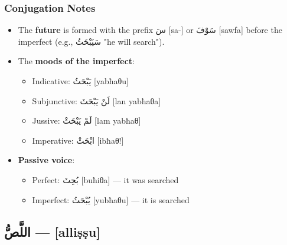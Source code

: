 \documentclass[letter,12pt]{article}
\begin{document}
\subsubsection*{Conjugation Notes}
\begin{itemize}
  \item The \textbf{future} is formed with the prefix \textarabic{سَ} [sa-] or \textarabic{سَوْفَ} [sawfa] before the imperfect (e.g., \textarabic{سَيَبْحَثُ} "he will search").
  \item The \textbf{moods of the imperfect}: 
    \begin{itemize}
      \item Indicative: \textarabic{يَبْحَثُ} [yabħaθu] 
      \item Subjunctive: \textarabic{لَنْ يَبْحَثَ} [lan yabħaθa]
      \item Jussive: \textarabic{لَمْ يَبْحَثْ} [lam yabħaθ]
      \item Imperative: \textarabic{ابْحَثْ} [ibħaθ!]
    \end{itemize}
  \item \textbf{Passive voice}: 
    \begin{itemize}
      \item Perfect: \textarabic{بُحِثَ} [buħiθa] — it was searched
      \item Imperfect: \textarabic{يُبْحَثُ} [yubħaθu] — it is searched
    \end{itemize}
\end{itemize}

\subsection{\textarabic{اللَّصُّ} — [alliṣṣu]}
\end{document}
